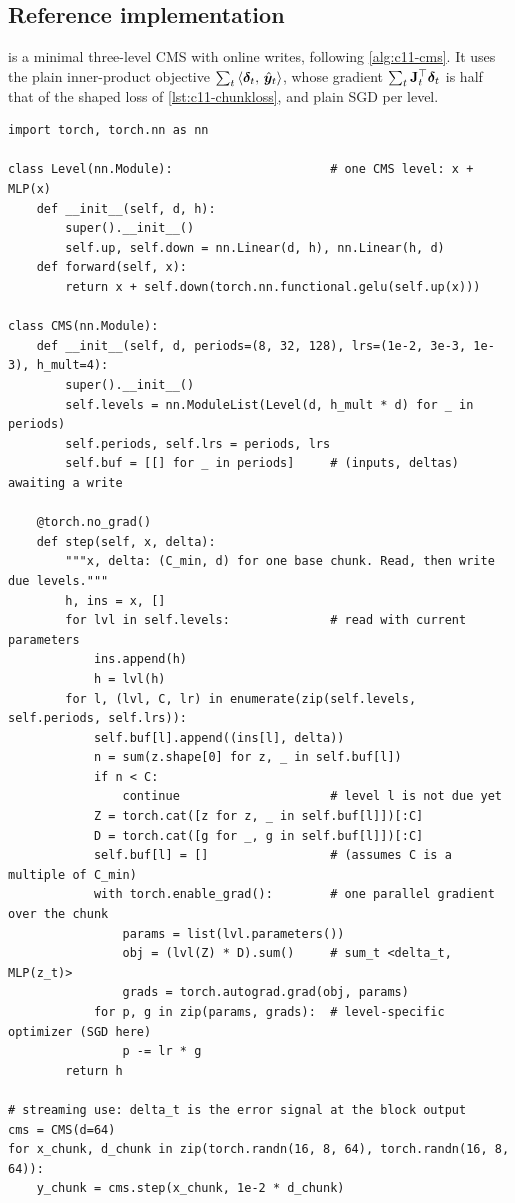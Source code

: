 \subsection{Reference implementation}\label{sec:c11-nl-ref}

 is a minimal three-level CMS with online writes, following
\cref{alg:c11-cms}. It uses the plain inner-product objective
$\sum_t\left\langle \bm{\delta}_t,\, \hat{\bm{y}}_t\right\rangle$, whose gradient $\sum_t\mathbf{J}_t^{\top}\bm{\delta}_t$ is half
that of the shaped loss of \cref{lst:c11-chunkloss}, and plain SGD per level.

\begin{lstlisting}[caption={Reference implementation (ours): a three-level Continuum Memory System with a multi-frequency write schedule},label={lst:c11-cms-ref}]
import torch, torch.nn as nn

class Level(nn.Module):                      # one CMS level: x + MLP(x)
    def __init__(self, d, h):
        super().__init__()
        self.up, self.down = nn.Linear(d, h), nn.Linear(h, d)
    def forward(self, x):
        return x + self.down(torch.nn.functional.gelu(self.up(x)))

class CMS(nn.Module):
    def __init__(self, d, periods=(8, 32, 128), lrs=(1e-2, 3e-3, 1e-3), h_mult=4):
        super().__init__()
        self.levels = nn.ModuleList(Level(d, h_mult * d) for _ in periods)
        self.periods, self.lrs = periods, lrs
        self.buf = [[] for _ in periods]     # (inputs, deltas) awaiting a write

    @torch.no_grad()
    def step(self, x, delta):
        """x, delta: (C_min, d) for one base chunk. Read, then write due levels."""
        h, ins = x, []
        for lvl in self.levels:              # read with current parameters
            ins.append(h)
            h = lvl(h)
        for l, (lvl, C, lr) in enumerate(zip(self.levels, self.periods, self.lrs)):
            self.buf[l].append((ins[l], delta))
            n = sum(z.shape[0] for z, _ in self.buf[l])
            if n < C:
                continue                     # level l is not due yet
            Z = torch.cat([z for z, _ in self.buf[l]])[:C]
            D = torch.cat([g for _, g in self.buf[l]])[:C]
            self.buf[l] = []                 # (assumes C is a multiple of C_min)
            with torch.enable_grad():        # one parallel gradient over the chunk
                params = list(lvl.parameters())
                obj = (lvl(Z) * D).sum()     # sum_t <delta_t, MLP(z_t)>
                grads = torch.autograd.grad(obj, params)
            for p, g in zip(params, grads):  # level-specific optimizer (SGD here)
                p -= lr * g
        return h

# streaming use: delta_t is the error signal at the block output
cms = CMS(d=64)
for x_chunk, d_chunk in zip(torch.randn(16, 8, 64), torch.randn(16, 8, 64)):
    y_chunk = cms.step(x_chunk, 1e-2 * d_chunk)
\end{lstlisting}

